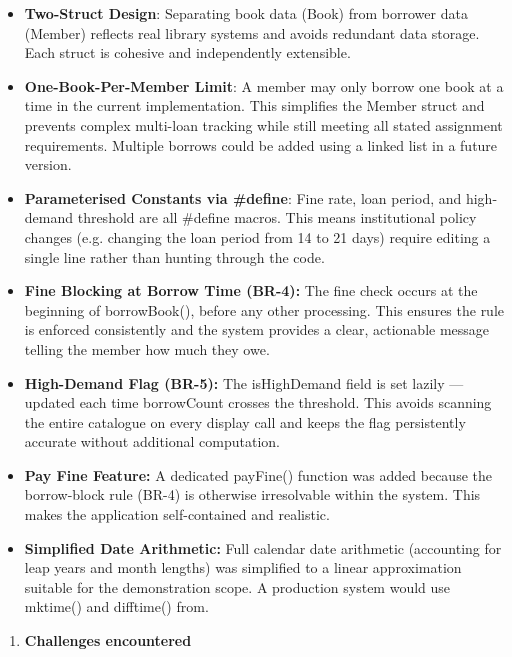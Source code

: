 \documentclass[
]{article}
\begin{document}
\begin{itemize}
\item
  \textbf{Two-Struct Design}: Separating book data (Book) from borrower
  data (Member) reflects real library systems and avoids redundant data
  storage. Each struct is cohesive and independently extensible.
\item
  \textbf{One-Book-Per-Member Limit}: A member may only borrow one book
  at a time in the current implementation. This simplifies the Member
  struct and prevents complex multi-loan tracking while still meeting
  all stated assignment requirements. Multiple borrows could be added
  using a linked list in a future version.
\item
  \textbf{Parameterised Constants via \#define}: Fine rate, loan period,
  and high-demand threshold are all \#define macros. This means
  institutional policy changes (e.g. changing the loan period from 14 to
  21 days) require editing a single line rather than hunting through the
  code.
\item
  \textbf{Fine Blocking at Borrow Time (BR-4):} The fine check occurs at
  the beginning of borrowBook(), before any other processing. This
  ensures the rule is enforced consistently and the system provides a
  clear, actionable message telling the member how much they owe.
\item
  \textbf{High-Demand Flag (BR-5):} The isHighDemand field is set lazily
  --- updated each time borrowCount crosses the threshold. This avoids
  scanning the entire catalogue on every display call and keeps the flag
  persistently accurate without additional computation.
\item
  \textbf{Pay Fine Feature:} A dedicated payFine() function was added
  because the borrow-block rule (BR-4) is otherwise irresolvable within
  the system. This makes the application self-contained and realistic.
\item
  \textbf{Simplified Date Arithmetic:} Full calendar date arithmetic
  (accounting for leap years and month lengths) was simplified to a
  linear approximation suitable for the demonstration scope. A
  production system would use mktime() and difftime() from.
\end{itemize}

\begin{enumerate}
\def\labelenumi{\arabic{enumi}.}
\setcounter{enumi}{6}
\item
  \textbf{Challenges encountered}
\end{enumerate}
\end{document}
